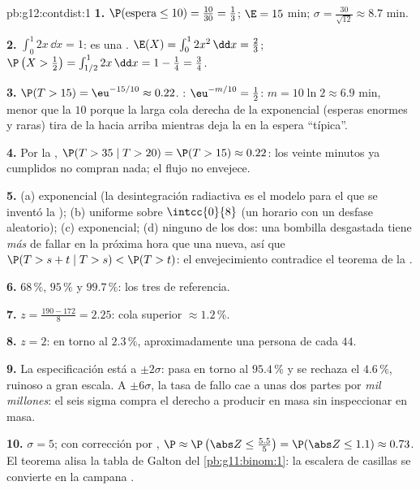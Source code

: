 \begin{solution}{pb:g12:contdist:1}
\textbf{1.} $\P(\text{espera} \leq 10) = \frac{10}{30} = \frac13$;
$\E = 15$ min; $\sigma = \frac{30}{\sqrt{12}} \approx 8.7$ min.

\textbf{2.} $\int_0^1 2x\,\dd x = 1$: es una .
$\E(X) = \int_0^1 2x^2\,\dd x = \frac23$;
$\P\left(X > \frac12\right) = \int_{1/2}^1 2x\,\dd x = 1 - \frac14 =
\frac34$.

\textbf{3.} $\P(T > 15) = \eu^{-15/10} \approx 0.22$. :
$\eu^{-m/10} = \frac12$: $m = 10\ln 2 \approx 6.9$ min, menor que la 
$10$ porque la larga cola derecha de la exponencial (esperas enormes y
raras) tira de la  hacia arriba mientras deja la  en la espera
``típica''.

\textbf{4.} Por la ,
$\P(T > 35 \mid T > 20) = \P(T > 15) \approx 0.22$: los veinte minutos ya
cumplidos no compran nada; el flujo no envejece.

\textbf{5.} (a) exponencial (la desintegración radiactiva es el modelo para
el que se inventó la ); (b) uniforme sobre $\intcc{0}{8}$
(un horario con un desfase aleatorio); (c) exponencial; (d) ninguno de los
dos: una bombilla desgastada tiene \emph{más}  de fallar en la
próxima hora que una nueva, así que
$\P(T > s + t \mid T > s) < \P(T > t)$: el envejecimiento contradice el
teorema de la .

\textbf{6.} $68\,\%$, $95\,\%$ y $99.7\,\%$: los tres  de
referencia.

\textbf{7.} $z = \frac{190 - 172}{8} = 2.25$: cola superior
$\approx 1.2\,\%$.

\textbf{8.} $z = 2$: en torno al $2.3\,\%$, aproximadamente una persona de
cada $44$.

\textbf{9.} La especificación está a $\pm 2\sigma$: pasa en torno al
$95.4\,\%$ y se rechaza el $4.6\,\%$, ruinoso a gran escala. A
$\pm 6\sigma$, la tasa de fallo cae a unas dos partes por \emph{mil
millones}: el seis sigma compra el derecho a producir en masa sin
inspeccionar en masa.

\textbf{10.} $\sigma = 5$; con corrección por ,
$\P \approx \P\left(\abs Z \leq \frac{5.5}{5}\right) =
\P(\abs Z \leq 1.1) \approx 0.73$. El teorema alisa la tabla de Galton del
\cref{pb:g11:binom:1}: la escalera de casillas se convierte en la campana
.


\end{solution}
